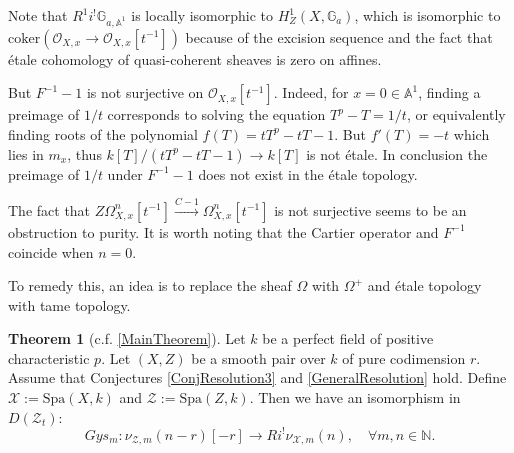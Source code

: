 \documentclass{amsart}
\def\Spa{\textrm{Spa}}
\theoremstyle{definition}
\newtheorem{theorem}{Theorem}[section]
\numberwithin{equation}{section}
\begin{document}
Note that $R^1i^{!} \mathbb{G}_{a,\mathbb{A}^1}$ is locally isomorphic to $H^1_Z(X,\mathbb{G}_a)$, which is isomorphic to $\textrm{coker}(\mathcal{O}_{X,x}\to \mathcal{O}_{X,x}[t^{-1}])$ because of the excision sequence and the fact that \'etale cohomology of quasi-coherent sheaves is zero on affines.

But $F^{-1}-1$ is not surjective on $\mathcal{O}_{X,x}[t^{-1}]$. Indeed, for $x=0\in \mathbb{A}^1$, finding a preimage of $1/t$ corresponds to solving the equation $T^p-T=1/t$, or equivalently finding roots of the polynomial $f(T)=tT^p-tT-1$. But $f'(T)=-t$ which lies in $m_x$, thus $k[T]/(tT^p-tT-1)\to k[T]$ is not \'etale. In conclusion the preimage of $1/t$ under $F^{-1}-1$ does not exist in the \'etale topology.

The fact that $Z\Omega_{X,x}^{n}[t^{-1}]\xrightarrow{C-1} \Omega_{X,x}^n[t^{-1}]$ is not surjective seems to be an obstruction to purity. It is worth noting that the Cartier operator and $F^{-1}$ coincide when $n=0$. 

To remedy this, an idea is to replace the sheaf $\Omega$ with $\Omega^+$ and \'etale topology with tame topology. 

\begin{theorem}[c.f. \cref{MainTheorem}]\label{MainTheoremAtTheEnd}
Let $k$ be a perfect field of positive characteristic $p$. Let $(X,Z)$ be a smooth pair over $k$ of pure codimension $r$. Assume that Conjectures \ref{ConjResolution3} and \ref{GeneralResolution} hold. Define $\mathcal{X}:=\Spa(X,k)$ and $\mathcal{Z}:=\Spa(Z,k)$. Then we have an isomorphism in $D(\mathcal{Z}_t)$:
\[
Gys_{m}:\nu_{\mathcal{Z},m}(n-r)[-r]\to Ri^!\nu_{\mathcal{X},m}(n), \quad \forall m,n \in \mathbb{N}.
\]
\end{theorem}
\end{document}
